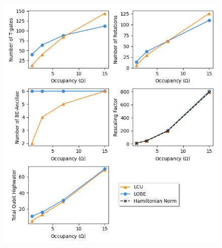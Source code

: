 \begin{figure}[h]
    \centering
    \includegraphics[width = 15cm]{figures/phi4_occupancies.png}
    \caption{}
    \label{}
\end{figure}